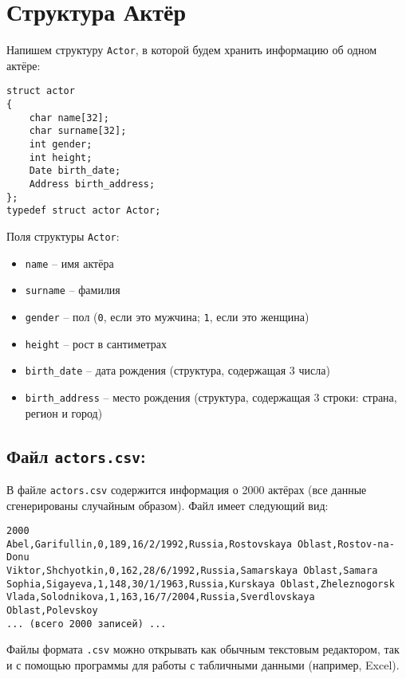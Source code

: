 \documentclass{article}
\begin{document}
\section{Структура Актёр}
Напишем структуру \texttt{Actor}, в которой будем хранить информацию об одном актёре:
\begin{lstlisting}
struct actor 
{
    char name[32];
    char surname[32];
    int gender;
    int height;
    Date birth_date;
    Address birth_address;
};
typedef struct actor Actor;
\end{lstlisting}

Поля структуры \texttt{Actor}:
\begin{itemize}
\item \texttt{name} -- имя актёра
\item \texttt{surname} -- фамилия
\item \texttt{gender} -- пол (\texttt{0}, если это мужчина; \texttt{1}, если это женщина)
\item \texttt{height} -- рост в сантиметрах
\item \texttt{birth\_date} -- дата рождения (структура, содержащая 3 числа)
\item \texttt{birth\_address} -- место рождения (структура, содержащая 3 строки: страна, регион и город)
\end{itemize}


\subsection*{Файл \texttt{actors.csv}:}
В файле \texttt{actors.csv} содержится информация о 2000 актёрах (все данные сгенерированы случайным образом). Файл имеет следующий вид:
\begin{verbatim}
2000
Abel,Garifullin,0,189,16/2/1992,Russia,Rostovskaya Oblast,Rostov-na-Donu
Viktor,Shchyotkin,0,162,28/6/1992,Russia,Samarskaya Oblast,Samara
Sophia,Sigayeva,1,148,30/1/1963,Russia,Kurskaya Oblast,Zheleznogorsk
Vlada,Solodnikova,1,163,16/7/2004,Russia,Sverdlovskaya Oblast,Polevskoy
... (всего 2000 записей) ...
\end{verbatim}
Файлы формата \texttt{.csv} можно открывать как обычным текстовым редактором, так и с помощью программы для работы с табличными данными (например, Excel). 
\end{document}
